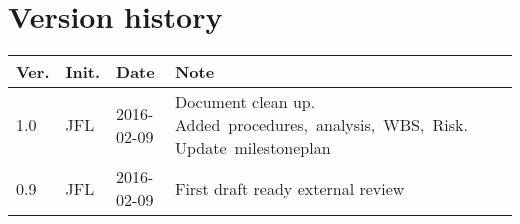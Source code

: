 \chapter*{Version history}
\label{app:rev_his}


\begin{tabular}{b{1cm} b{1cm} b{2cm} b{8cm}}
    \textbf{Ver.} & \textbf{Init.} & \textbf{Date} & \textbf{Note} \\
    \hline
    1.0 & JFL & 2016-02-09 & Document clean up. Added~procedures,~analysis,~WBS,~Risk. Update~milestoneplan \\
    0.9 & JFL & 2016-02-09 & First draft ready external review \\
\end{tabular}
